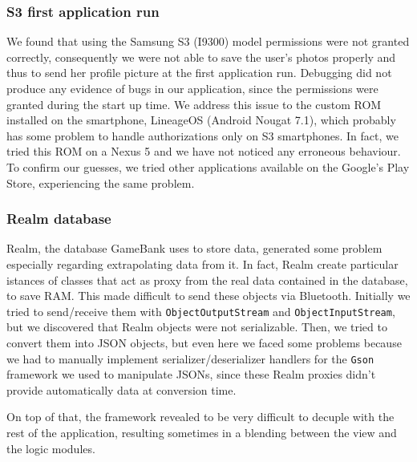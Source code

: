 \subsubsection{S3 first application run}

We found that using the Samsung S3 (I9300) model permissions were not granted 
correctly, consequently we were not able to save the user's photos properly and 
thus to send her profile picture at the first application run. Debugging did 
not produce any evidence of bugs in our application, since the permissions 
were granted during the start up time.
We address this issue to the custom ROM installed on the smartphone, LineageOS 
(Android Nougat 7.1), which probably has some problem to handle authorizations 
only on S3 smartphones. In fact, we tried this ROM on a Nexus 5 and we have not 
noticed any erroneous behaviour. To confirm our guesses, we tried other 
applications available on the Google's Play Store, experiencing the same 
problem.

\subsubsection{Realm database}

Realm, the database GameBank uses to store data, generated some problem 
especially regarding extrapolating data from it. In fact, Realm create 
particular istances of classes that act as proxy from the real data contained 
in the database, to save RAM. This made difficult to send these objects 
via Bluetooth. Initially we tried to send/receive them with 
\texttt{ObjectOutputStream} and \texttt{ObjectInputStream}, but we discovered 
that Realm objects were not serializable. Then, we tried to convert them into 
JSON objects, but even here we faced some problems because we had to manually 
implement serializer/deserializer handlers for the \texttt{Gson} framework we 
used to manipulate JSONs, since these Realm proxies didn't provide 
automatically data at conversion time.

On top of that, the framework revealed to be very difficult to decuple with the 
rest of the application, resulting sometimes in a blending between the view and 
the logic modules.
